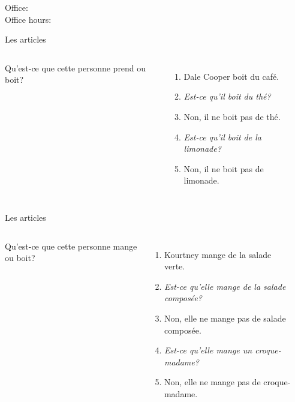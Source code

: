 \documentclass{beamer}
\subtitle[Passé composé]{Le passé composé}
\begin{document}
  \begin{frame}
    \titlepage
    \tiny{Office: \\
          Office hours: }
  \end{frame}

  \begin{frame}{Les articles}
    \begin{columns}
        Qu'est-ce que cette personne prend ou boit?
        \begin{enumerate}
          \item<2-> Dale Cooper boit du café.
          \item<2-> \emph{Est-ce qu'il boit du thé?}
          \item<3-> Non, il ne boit pas de thé.
          \item<3-> \emph{Est-ce qu'il boit de la limonade?}
          \item<4-> Non, il ne boit pas de limonade.
        \end{enumerate}
        \begin{minipage}[c][0.6\textwidth]{\linewidth}
          \begin{center}
          \end{center}
        \end{minipage}
    \end{columns}
  \end{frame}

  \begin{frame}{Les articles}
    \begin{columns}
        Qu'est-ce que cette personne mange ou boit?
        \begin{enumerate}
          \item<2-> Kourtney mange de la salade verte.
          \item<2-> \emph{Est-ce qu'elle mange de la salade composée?}
          \item<3-> Non, elle ne mange pas de salade composée.
          \item<3-> \emph{Est-ce qu'elle mange un croque-madame?}
          \item<4-> Non, elle ne mange pas de croque-madame.
        \end{enumerate}
        \begin{minipage}[c][0.6\textwidth]{\linewidth}
          \begin{center}
          \end{center}
        \end{minipage}
    \end{columns}
  \end{frame}
\end{document}
